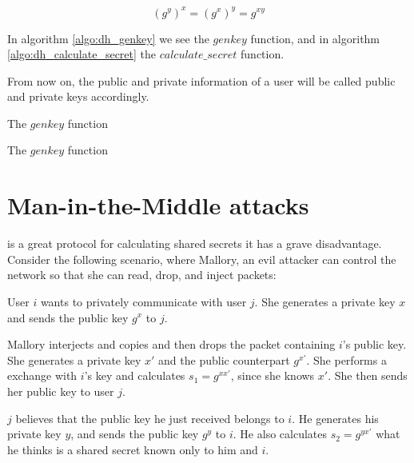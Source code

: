 \[
  (g^y)^x = (g^x)^y = g^{xy}
\]

In algorithm \ref{algo:dh_genkey} we see the $genkey$ function, and in algorithm \ref{algo:dh_calculate_secret} the $calculate\_secret$ function.

From now on, the public and private information of a user will be called public and private keys accordingly.

\begin{algorithm}[h]
  \caption{The $genkey$ function}
  \label{algo:dh_genkey}
\end{algorithm}

\begin{algorithm}[h]
  \caption{The $genkey$ function}
  \label{algo:dh_calculate_secret}
\end{algorithm}

\section{Man-in-the-Middle attacks}

\dhname is a great protocol for calculating shared secrets it has a grave disadvantage.
Consider the following scenario, where Mallory, an evil attacker can control the network so that she can read, drop, and inject packets:

User $i$ wants to privately communicate with user $j$.
She generates a private key $x$ and sends the public key $g^x$ to $j$.

Mallory interjects and copies and then drops the packet containing $i$'s public key.
She generates a private key $x\prime$ and the public counterpart $g^{x\prime}$.
She performs a \dhname exchange with $i$'s key and calculates $s_1 = g^{xx\prime}$, since she knows $x\prime$.
She then sends her public key to user $j$.

$j$ believes that the public key he just received belongs to $i$.
He generates his private key $y$, and sends the public key $g^y$ to $i$.
He also calculates $s_2 = g^{yx\prime}$ what he thinks is a shared secret known only to him and $i$.

